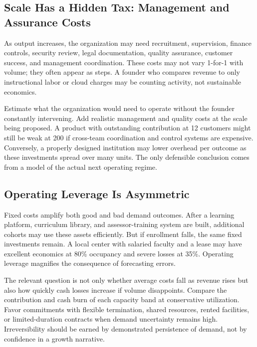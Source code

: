 \subsection{Scale Has a Hidden Tax: Management and Assurance Costs}
\label{sec:hidden_tax_management_assurance}

As output increases, the organization may need recruitment, supervision, finance controls, security review, legal documentation, quality assurance, customer success, and management coordination. These costs may not vary 1-for-1 with volume; they often appear as steps. A founder who compares revenue to only instructional labor or cloud charges may be counting activity, not sustainable economics.

Estimate what the organization would need to operate without the founder constantly intervening. Add realistic management and quality costs at the scale being proposed. A product with outstanding contribution at 12 customers might still be weak at 200 if cross-team coordination and control systems are expensive. Conversely, a properly designed institution may lower overhead per outcome as these investments spread over many units. The only defensible conclusion comes from a model of the actual next operating regime.

\subsection{Operating Leverage Is Asymmetric}
\label{sec:operating_leverage_asymmetric}

Fixed costs amplify both good and bad demand outcomes. After a learning platform, curriculum library, and assessor-training system are built, additional cohorts may use these assets efficiently. But if enrollment falls, the same fixed investments remain. A local center with salaried faculty and a lease may have excellent economics at 80\% occupancy and severe losses at 35\%. Operating leverage magnifies the consequence of forecasting errors.

The relevant question is not only whether average costs fall as revenue rises but also how quickly cash losses increase if volume disappoints. Compare the contribution and cash burn of each capacity band at conservative utilization. Favor commitments with flexible termination, shared resources, rented facilities, or limited-duration contracts when demand uncertainty remains high. Irreversibility should be earned by demonstrated persistence of demand, not by confidence in a growth narrative.

